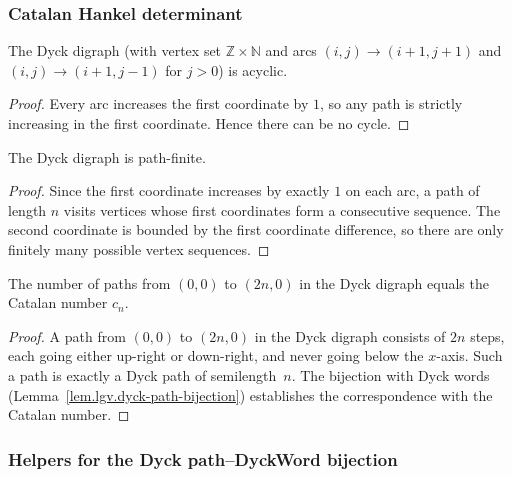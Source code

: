 \subsubsection{Catalan Hankel determinant}

\begin{lemma}
\label{lem.lgv.dyck-acyclic}
\leanhelper
\leanok
The Dyck digraph (with vertex set $\mathbb{Z} \times \mathbb{N}$ and arcs
$(i,j) \to (i+1, j+1)$ and $(i,j) \to (i+1, j-1)$ for $j > 0$) is acyclic.
\end{lemma}

\begin{proof}
\leanok
Every arc increases the first coordinate by $1$, so any path is strictly
increasing in the first coordinate.  Hence there can be no cycle.
\end{proof}

\begin{lemma}
\label{lem.lgv.dyck-pathfinite}
\leanhelper
\leanok
The Dyck digraph is path-finite.
\end{lemma}

\begin{proof}
\leanok
Since the first coordinate increases by exactly $1$ on each arc, a path of
length $n$ visits vertices whose first coordinates form a consecutive
sequence.  The second coordinate is bounded by the first coordinate
difference, so there are only finitely many possible vertex sequences.
\end{proof}

\begin{lemma}
\label{lem.lgv.dyck-paths-eq-catalan}
\leanhelper
\leanok
The number of paths from $(0, 0)$ to $(2n, 0)$ in the Dyck digraph
equals the Catalan number $c_n$.
\end{lemma}

\begin{proof}
\leanok
A path from $(0,0)$ to $(2n, 0)$ in the Dyck digraph consists of $2n$
steps, each going either up-right or down-right, and never going below
the $x$-axis.  Such a path is exactly a Dyck path of semilength~$n$.
The bijection with Dyck words (Lemma~\ref{lem.lgv.dyck-path-bijection})
establishes the correspondence with the Catalan number.
\end{proof}

\subsubsection{Helpers for the Dyck path--DyckWord bijection}

